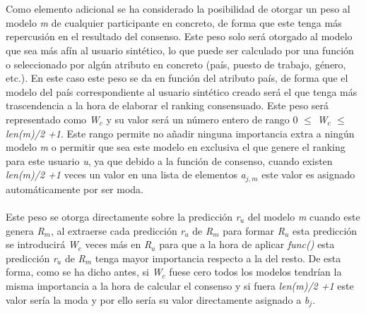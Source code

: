 \\ \\
Como elemento adicional se ha considerado la posibilidad de otorgar un peso al modelo \textit{m} de cualquier participante en concreto, de forma que este tenga más repercusión en el resultado del consenso. Este peso solo será otorgado al modelo que sea más afín al usuario sintético, lo que puede ser calculado por una función o seleccionado por algún atributo en concreto (país, puesto de trabajo, género, etc.). En este caso este peso se da en función del atributo país, de forma que el modelo del país correspondiente al usuario sintético creado será el que tenga más trascendencia a la hora de elaborar el ranking consensuado. Este peso será representado como \textit{W$_{c}$} y su valor será un número entero de rango 0 $\leq$ \textit{W$_{c}$} $\leq$ \textit{len(m)/2 +1}. Este rango permite no añadir ninguna importancia extra a ningún modelo \textit{m} o permitir que sea este modelo en exclusiva el que genere el ranking para este usuario \textit{u}, ya que debido a la función de consenso, cuando existen \textit{len(m)/2 +1} veces un valor en una lista de elementos \textit{a$_{j, m}$} este valor es asignado automáticamente por ser moda.
\\ \\
Este peso se otorga directamente sobre la predicción \textit{r$_{u}$} del  modelo \textit{m} cuando este genera \textit{R$_{m}$}, al extraerse cada predicción \textit{r$_{u}$} de \textit{R$_{m}$} para formar \textit{R$_{u}$} esta predicción se introducirá \textit{W$_{c}$} veces más en \textit{R$_{u}$} para que a la hora de aplicar \textit{func()} esta predicción \textit{r$_{u}$} de \textit{R$_{m}$} tenga mayor importancia respecto a la del resto. De esta forma, como se ha dicho antes, si \textit{W$_{c}$} fuese cero todos los modelos tendrían la misma importancia a la hora de calcular el consenso y si fuera \textit{len(m)/2 +1} este valor sería la moda y por ello sería su valor directamente asignado a \textit{b$_{j}$}.

